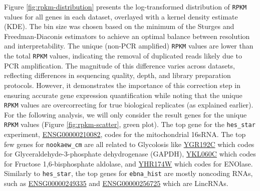 \documentclass{article}
\begin{document}
    Figure \ref{fig:rpkm-distribution} presents the log-transformed distribution of \texttt{RPKM} values for all genes in each dataset, overlayed with a kernel density estimate (KDE). The bin size was chosen based on the minimum of the Sturges and Freedman-Diaconis estimators to achieve an optimal balance between resolution and interpretability. The unique (non-PCR amplified) \texttt{RPKM} values are lower than the total \texttt{RPKM} values, indicating the removal of duplicated reads likely due to PCR amplification. The magnitude of this difference varies across datasets, reflecting differences in sequencing quality, depth, and library preparation protocols. However, it demonstrates the importance of this correction step in ensuring accurate gene expression quantification while noting that the unique \texttt{RPKM} values are overcorrecting for true biological replicates (as explained earlier). For the following analysis, we will only consider the result genes for the unique \texttt{RPKM} values (Figure \ref{fig:rpkm-scatter}, green plot). The top gene for the \texttt{hes\_star} experiment, \href{https://grch37.ensembl.org/Homo_sapiens/Gene/Summary?g=ENSG00000210082;r=MT:1671-3229;t=ENST00000387347}{ENSG00000210082}, codes for the mitochondrial 16sRNA. The top few genes for \texttt{nookaew\_cm} are all related to Glycolosis like \href{https://www.yeastgenome.org/locus/S000003424}{YGR192C} which codes for Glyceraldehyde-3-phosphate dehydrogenase (GAPDH), \href{https://www.yeastgenome.org/locus/S000001543}{YKL060C} which codes for Fructose 1,6-bisphosphate aldolase, and \href{https://www.yeastgenome.org/locus/S000001217}{YHR174W} which codes for ENOlase. Similarly to \texttt{hes\_star}, the top genes for \texttt{ebna\_hist} are mostly noncoding RNAs, such as \href{https://grch37.ensembl.org/Homo_sapiens/Gene/Summary?db=core;g=ENSG00000249335;r=5:68128412-68257985;t=ENST00000503268}{ENSG00000249335} and \href{https://grch37.ensembl.org/Homo_sapiens/Gene/Summary?db=core;g=ENSG00000256725;r=12:131112861-131200826}{ENSG00000256725} which are LincRNAs.

\end{document}
